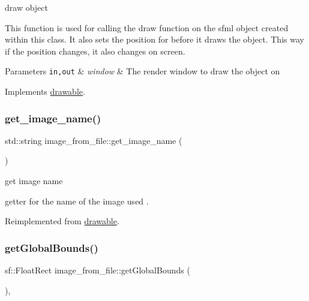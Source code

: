 draw object 

This function is used for calling the draw function on the sfml object created within this class. It also sets the position for before it draws the object. This way if the position changes, it also changes on screen.


\begin{DoxyParams}[1]{Parameters}
\mbox{\tt in,out}  & {\em window} & The render window to draw the object on \\
\hline
\end{DoxyParams}


Implements \hyperlink{classdrawable_a4e49e2c1121704c83ce24c5f48dd910f}{drawable}.

\mbox{\label{classimage__from__file_adb7af19d3d997ab5c0d5b7c8dfe32ded}} 
\subsubsection{\texorpdfstring{get\+\_\+image\+\_\+name()}{get\_image\_name()}}
{\footnotesize\ttfamily std\+::string image\+\_\+from\+\_\+file\+::get\+\_\+image\+\_\+name (\begin{DoxyParamCaption}{ }\end{DoxyParamCaption})\hspace{0.3cm}{\ttfamily [virtual]}}



get image name 

getter for the name of the image used . 

Reimplemented from \hyperlink{classdrawable_a59285b12c068ce5e02def707f0b0ee3b}{drawable}.

\mbox{\label{classimage__from__file_a971a591f906fa5c6e85b4e32cfc3d6a0}} 
\subsubsection{\texorpdfstring{get\+Global\+Bounds()}{getGlobalBounds()}}
{\footnotesize\ttfamily sf\+::\+Float\+Rect image\+\_\+from\+\_\+file\+::get\+Global\+Bounds (\begin{DoxyParamCaption}{ }\end{DoxyParamCaption})\hspace{0.3cm}{\ttfamily [override]}, {\ttfamily [virtual]}}



